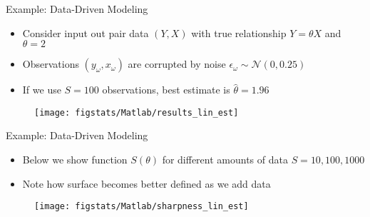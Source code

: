 \documentclass[9pt]{beamer}
\begin{document}
%
\begin{frame}{Example: Data-Driven Modeling}

\begin{block}{}
\begin{itemize}
\item Consider input out pair data $(Y,X)$ with true relationship $Y=\theta X$ and $\theta=2$
\item Observations $(y_\omega,x_\omega)$ are corrupted by noise $\epsilon_\omega  \sim \mathcal{N}(0,0.25)$
\item If we use $S=100$ observations, best estimate is $\hat{\theta}=1.96$ 
\end{itemize}
\end{block}

\begin{figure}[!htb]
    \centering
	\texttt{[image: figstats/Matlab/results\_lin\_est]}
\end{figure}

\end{frame}

%
\begin{frame}{Example: Data-Driven Modeling}

\begin{block}{}
\begin{itemize}
\item Below we show function $S(\theta)$ for different amounts of data $S=10,100,1000$
\item Note how surface becomes better defined as we add data
\end{itemize}
\end{block}

\begin{figure}[!htb]
    \centering
	\texttt{[image: figstats/Matlab/sharpness\_lin\_est]}
\end{figure}

\end{frame}
\end{document}
